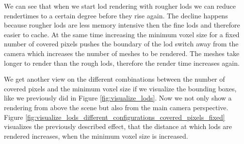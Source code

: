 We can see that when we start \ac{lod} rendering with rougher \acsp{lod} we can reduce rendertimes to a certain degree before they rise again.
The decline happens because rougher \acsp{lod} are less memory intensive then the fine \acsp{lod} and therefore easier to cache.
At the same time increasing the minimum voxel size for a fixed number of covered pixels pushes the boundary of the \ac{lod} switch away from the camera which increases the number of meshes to be rendered.
The meshes take longer to render than the rough \acsp{lod}, therefore the render time increases again.

We get another view on the different combinations between the number of covered pixels and the minimum voxel size if we visualize the bounding boxes, like we previously did in Figure \ref{fig:visualize_lods}.
Now we not only show a rendering from above the scene but also from the main camera perspective.
Figure \ref{fig:visualize_lods_different_configurations_covered_pixels_fixed} visualizes the previously described effect, that the distance at which \acsp{lod} are rendered increases, when the minimum voxel size is increased.
